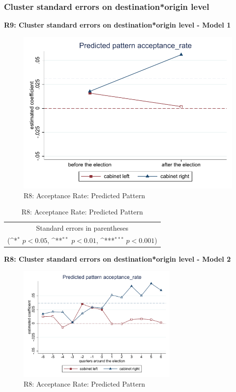 \documentclass[10pt,a4paper]{scrartcl}
\begin{document}
\subsubsection{Cluster standard errors on destination*origin level}
\textbf{R9: Cluster standard errors on destination*origin level - Model 1}
\begin{figure}[!ht]
	\centering
	\includegraphics[width=1\textwidth]{figures_edited/acceptance_rate_graph1_R8.pdf}
	\caption{R8: Acceptance Rate: Predicted Pattern}
\end{figure}

\begin{table}[!ht]\centering
	\renewcommand{\arraystretch}{1.25}
	\def\sym#1{\ifmmode^{#1}\else\(^{#1}\)\fi}
	\caption{R8: Acceptance Rate: Predicted Pattern}
	\begin{tabular}{l*{2}{c}}
		\hline\hline
		
		\hline\hline
		\multicolumn{3}{c}{\footnotesize Standard errors in parentheses} \\
		\multicolumn{3}{c}{\footnotesize (\sym{*} \(p<0.05\), \sym{**} \(p<0.01\), \sym{***} \(p<0.001\))}\\
	\end{tabular}
\end{table}

\clearpage
\textbf{R8: Cluster standard errors on destination*origin level - Model 2}
\begin{figure}[!ht]
	\centering
	\includegraphics[width=0.7\textwidth]{figures_edited/acceptance_rate_graph2_R8.pdf}
	\caption{R8: Acceptance Rate: Predicted Pattern}
\end{figure}
\end{document}
